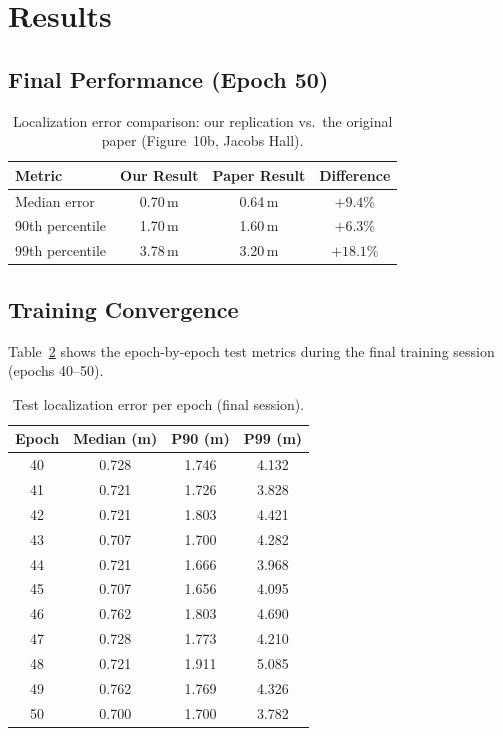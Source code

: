 \documentclass[12pt,a4paper]{article}
\begin{document}
\section{Results}

\subsection{Final Performance (Epoch 50)}

\begin{table}[H]
\centering
\caption{Localization error comparison: our replication vs.\ the original paper (Figure~10b, Jacobs Hall).}
\label{tab:results}
\begin{tabular}{@{}lccc@{}}
\toprule
\textbf{Metric} & \textbf{Our Result} & \textbf{Paper Result} & \textbf{Difference} \\
\midrule
Median error     & 0.70\,m & 0.64\,m & $+9.4\%$ \\
90th percentile  & 1.70\,m & 1.60\,m & $+6.3\%$ \\
99th percentile  & 3.78\,m & 3.20\,m & $+18.1\%$ \\
\bottomrule
\end{tabular}
\end{table}

\subsection{Training Convergence}

Table~\ref{tab:convergence} shows the epoch-by-epoch test metrics during the final training session (epochs 40--50).

\begin{table}[H]
\centering
\caption{Test localization error per epoch (final session).}
\label{tab:convergence}
\begin{tabular}{@{}cccc@{}}
\toprule
\textbf{Epoch} & \textbf{Median (m)} & \textbf{P90 (m)} & \textbf{P99 (m)} \\
\midrule
40 & 0.728 & 1.746 & 4.132 \\
41 & 0.721 & 1.726 & 3.828 \\
42 & 0.721 & 1.803 & 4.421 \\
43 & 0.707 & 1.700 & 4.282 \\
44 & 0.721 & 1.666 & 3.968 \\
45 & 0.707 & 1.656 & 4.095 \\
46 & 0.762 & 1.803 & 4.690 \\
47 & 0.728 & 1.773 & 4.210 \\
48 & 0.721 & 1.911 & 5.085 \\
49 & 0.762 & 1.769 & 4.326 \\
50 & 0.700 & 1.700 & 3.782 \\
\bottomrule
\end{tabular}
\end{table}
\end{document}
